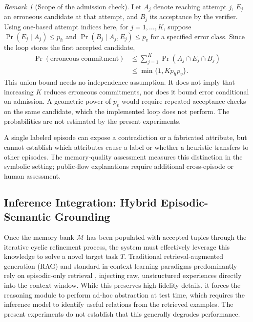 \documentclass[onecolumn]{IEEEtran}
\numberwithin{equation}{section}
\theoremstyle{definition}
\theoremstyle{remark}
\newtheorem{remark}[theorem]{Remark}
\begin{document}
\begin{remark}[Scope of the admission check]
Let $A_j$ denote reaching attempt $j$, $E_j$ an erroneous candidate at that attempt, and $B_j$ its acceptance by the verifier. Using one-based attempt indices here, for $j=1,\ldots,K$, suppose
$\Pr(E_j\mid A_j)\leq p_h$ and
$\Pr(B_j\mid A_j,E_j)\leq p_v$ for a specified error class.
Since the loop stores the first accepted candidate,
\begin{equation}
\begin{aligned}
\Pr(\text{erroneous commitment})
&\leq \sum_{j=1}^{K}\Pr(A_j\cap E_j\cap B_j)\\
&\leq \min\{1,Kp_hp_v\}.
\end{aligned}
\end{equation}
This union bound needs no independence assumption. It does not imply that increasing $K$ reduces erroneous commitments, nor does it bound error conditional on admission. A geometric power of $p_v$ would require repeated acceptance checks on the same candidate, which the implemented loop does not perform. The probabilities are not estimated by the present experiments.
\end{remark}
A single labeled episode can expose a contradiction or a fabricated attribute, but cannot establish which attributes cause a label or whether a heuristic transfers to other episodes. The memory-quality assessment measures this distinction in the symbolic setting; public-flow explanations require additional cross-episode or human assessment.

\subsection{Inference Integration: Hybrid Episodic-Semantic Grounding}

Once the memory bank $\mathcal{M}$ has been populated with accepted tuples through the iterative cyclic refinement process, the system must effectively leverage this knowledge to solve a novel target task $T$. Traditional retrieval-augmented generation (RAG) and standard in-context learning paradigms predominantly rely on episodic-only retrieval \cite{lewis2020retrieval, zhang2022active}, injecting raw, unstructured experiences directly into the context window. While this preserves high-fidelity details, it forces the reasoning module to perform ad-hoc abstraction at test time, which requires the inference model to identify useful relations from the retrieved examples. The present experiments do not establish that this generally degrades performance.
\end{document}
